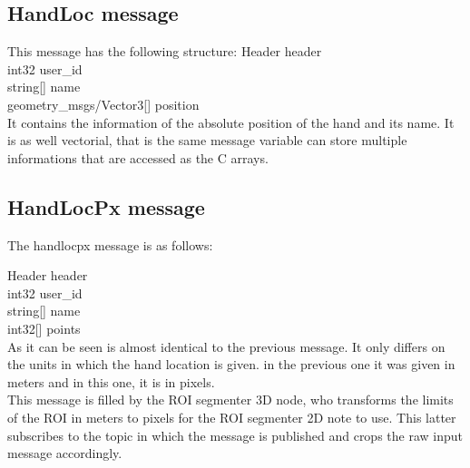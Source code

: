 \subsection{HandLoc message}
This message has the following structure: 
Header header\\
int32 user\_id\\
string[] name\\
geometry\_msgs/Vector3[] position
\\

It contains the information of the absolute position of the hand and its name. It is as well vectorial, that is the same message variable can store multiple informations that are accessed as the C arrays. 

\subsection{HandLocPx message}
The handlocpx message is as follows: 

Header header\\
int32 user\_id\\
string[] name\\
int32[] points\\

As it can be seen is almost identical to the previous message. It only differs on the units in which the hand location is given. in the previous one it was given in meters and in this one, it is in pixels. 
\\

This message is filled by the ROI segmenter 3D node, who transforms the limits of the ROI in meters to pixels for the ROI segmenter 2D note to use. This latter subscribes to the topic in which the message is published and crops the raw input message accordingly. 